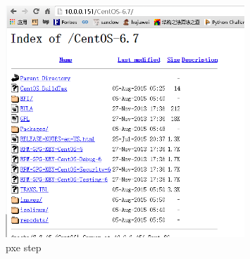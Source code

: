 \begin{figure}[!ht]
    \centering
     \caption{\label{Fig:kickstart-dhcp} pxe step}
    \includegraphics[width=0.8\textwidth]{cobble/images/kickstart-dhcp.png}
\end{figure}


